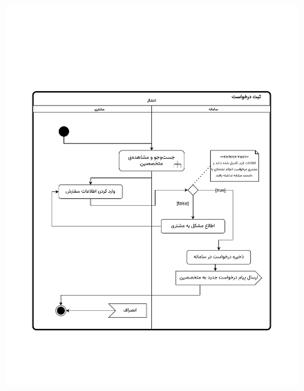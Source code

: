 \begin{figure}[ht!]
	\centering
	\includegraphics[scale=0.8, page=1]{figs/OOD-activity-submitreq.pdf}
\end{figure}
\FloatBarrier
\newpage






